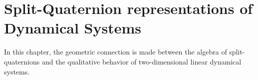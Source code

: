 \chapter{Split-Quaternion representations of Dynamical Systems}
\label{chap:quaternion}
In this chapter, the geometric connection is made between the algebra of split-quaternions and the qualitative behavior of two-dimensional linear dynamical systems. 





